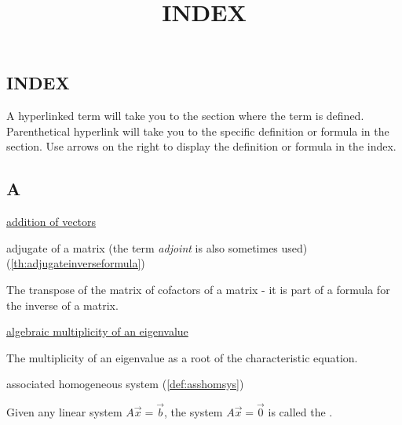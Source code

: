 \documentclass{ximera}
\title{INDEX} \license{CC BY-NC-SA 4.0}
\begin{document}
\begin{abstract}
\end{abstract}
\maketitle


\begin{onlineOnly}
\section*{INDEX}
\end{onlineOnly}

A hyperlinked term will take you to the section where the term is defined.  Parenthetical hyperlink will take you to the specific definition or formula in the section.  Use arrows on the right to display the definition or formula in the index.
\subsection*{A}
\href{https://ximera.osu.edu/linearalgebradzv3/LinearAlgebraInteractiveIntro/VEC-0030/main}{addition of vectors}


adjugate of a matrix (the term \emph{adjoint} is also sometimes used) (\ref{th:adjugateinverseformula})
\begin{expandable}{}{}
    The transpose of the matrix of cofactors of a matrix - it is part of a formula for the inverse of a matrix.
\end{expandable}

\href{https://ximera.osu.edu/linearalgebradzv3/LinearAlgebraInteractiveIntro/EIG-0020/main}{algebraic multiplicity of an eigenvalue}
\begin{expandable}{}{}
    The multiplicity of an eigenvalue as a root of the characteristic equation.
\end{expandable}

associated homogeneous system (\ref{def:asshomsys})
\begin{expandable}{}{}
    Given any linear system $A\vec{x}=\vec{b}$, the system $A\vec{x}=\vec{0}$ is called the .
\end{expandable}
\end{document}
